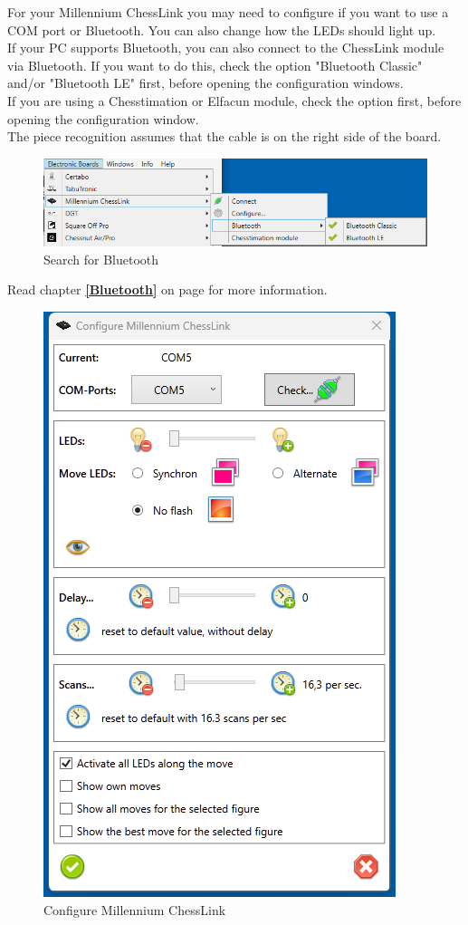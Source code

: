 \documentclass[11pt,a4paper]{article}
\begin{document}
For your Millennium ChessLink you may need to configure if you want to use a COM port or Bluetooth. You can also change how the LEDs should light up.\\
If your PC supports Bluetooth, you can also connect to the ChessLink module via Bluetooth. If you want to do this, check the option "Bluetooth Classic" and/or "Bluetooth LE" first, before opening the configuration windows.\\
If you are using a Chesstimation or Elfacun module, check the option first, before opening the configuration window.\\
The piece recognition assumes that the cable is on the right side of the board.

\begin{figure}[H]
	\centering
	\includegraphics[scale=0.7]{MillenniumChessLink9.png}
	\caption{Search for Bluetooth}
	\label{fig:MillenniumChessLink9}
\end{figure}
Read chapter \textbf{\ref{Bluetooth}  } on page \pageref{Bluetooth} for more information.

\begin{figure}[H]
	\centering
	\includegraphics[scale=1.0]{MillenniumChessLink2.png}
	\caption{Configure Millennium ChessLink}
	\label{fig:MillenniumChessLink2}
\end{figure}
\end{document}

